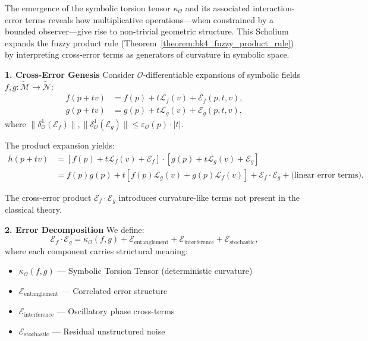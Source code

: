 \begin{scholium}
\label{scholium:bk4_higher_order_cross_error_structure}

The emergence of the symbolic torsion tensor $\kappa_{\mathcal{O}}$ and its associated interaction-error terms reveals how multiplicative operations---when constrained by a bounded observer---give rise to non-trivial geometric structure. This Scholium expands the fuzzy product rule (Theorem~\ref{theorem:bk4_fuzzy_product_rule}) by interpreting cross-error terms as generators of curvature in symbolic space.

\textbf{1. Cross-Error Genesis}
Consider $\mathcal{O}$-differentiable expansions of symbolic fields $f, g: \tilde{\mathcal{M}} \rightarrow \tilde{\mathcal{N}}$:
\begin{align}
    f(p + tv) &= f(p) + t\mathcal{L}_f(v) + \mathcal{E}_f(p,t,v), \\
    g(p + tv) &= g(p) + t\mathcal{L}_g(v) + \mathcal{E}_g(p,t,v),
\end{align}
where $\|\delta^1_{\mathcal{O}}(\mathcal{E}_f)\|, \|\delta^1_{\mathcal{O}}(\mathcal{E}_g)\| \leq \varepsilon_{\mathcal{O}}(p) \cdot |t|$.

The product expansion yields:
\begin{align}
    h(p+tv) &= [f(p) + t\mathcal{L}_f(v) + \mathcal{E}_f] \cdot [g(p) + t\mathcal{L}_g(v) + \mathcal{E}_g] \\
    &= f(p)g(p) + t[f(p)\mathcal{L}_g(v) + g(p)\mathcal{L}_f(v)] + \mathcal{E}_f \cdot \mathcal{E}_g + \text{(linear error terms)}.
\end{align}

The cross-error product $\mathcal{E}_f \cdot \mathcal{E}_g$ introduces curvature-like terms not present in the classical theory.

\textbf{2. Error Decomposition}
We define:
\[
\mathcal{E}_f \cdot \mathcal{E}_g = \kappa_{\mathcal{O}}(f,g) + \mathcal{E}_{\text{entanglement}} + \mathcal{E}_{\text{interference}} + \mathcal{E}_{\text{stochastic}},
\]
where each component carries structural meaning:
\begin{itemize}
    \item $\kappa_{\mathcal{O}}(f,g)$ --- Symbolic Torsion Tensor (deterministic curvature)
    \item $\mathcal{E}_{\text{entanglement}}$ --- Correlated error structure
    \item $\mathcal{E}_{\text{interference}}$ --- Oscillatory phase cross-terms
    \item $\mathcal{E}_{\text{stochastic}}$ --- Residual unstructured noise
\end{itemize}


\end{scholium}
